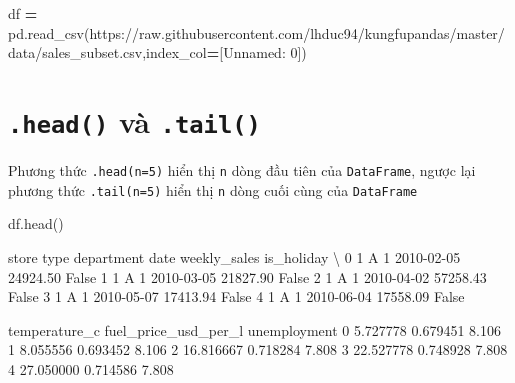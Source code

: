\documentclass[
]{book}
\newenvironment{Shaded}{\begin{snugshade}}{\end{snugshade}}
\newcommand{\NormalTok}[1]{#1}
\newcommand{\OperatorTok}[1]{\textcolor[rgb]{0.81,0.36,0.00}{\textbf{#1}}}
\newcommand{\StringTok}[1]{\textcolor[rgb]{0.31,0.60,0.02}{#1}}
\begin{document}
\begin{Shaded}
\begin{Highlighting}[]
\NormalTok{df }\OperatorTok{=}\NormalTok{ pd.read\_csv(}\StringTok{\textquotesingle{}https://raw.githubusercontent.com/lhduc94/kungfupandas/master/data/sales\_subset.csv\textquotesingle{}}\NormalTok{,index\_col}\OperatorTok{=}\NormalTok{[}\StringTok{\textquotesingle{}Unnamed: 0\textquotesingle{}}\NormalTok{])}
\end{Highlighting}
\end{Shaded}

\section{\texorpdfstring{\texttt{.head()} và \texttt{.tail()}}{.head() và .tail()}}\label{head-vuxe0-.tail}

Phương thức \texttt{.head(n=5)} hiển thị \texttt{n} dòng đầu tiên của \texttt{DataFrame}, ngược lại phương thức \texttt{.tail(n=5)} hiển thị \texttt{n} dòng cuối cùng của \texttt{DataFrame}

\begin{Shaded}
\begin{Highlighting}[]
\NormalTok{df.head()}
\end{Highlighting}
\end{Shaded}

\begin{Shaded}
\begin{Highlighting}[]
\NormalTok{        store type  department        date  weekly\_sales  is\_holiday  \textbackslash{}}
\NormalTok{0      1    A           1  2010{-}02{-}05      24924.50       False   }
\NormalTok{1      1    A           1  2010{-}03{-}05      21827.90       False   }
\NormalTok{2      1    A           1  2010{-}04{-}02      57258.43       False   }
\NormalTok{3      1    A           1  2010{-}05{-}07      17413.94       False   }
\NormalTok{4      1    A           1  2010{-}06{-}04      17558.09       False }

\NormalTok{   temperature\_c  fuel\_price\_usd\_per\_l  unemployment  }
\NormalTok{0       5.727778              0.679451         8.106  }
\NormalTok{1       8.055556              0.693452         8.106  }
\NormalTok{2      16.816667              0.718284         7.808  }
\NormalTok{3      22.527778              0.748928         7.808  }
\NormalTok{4      27.050000              0.714586         7.808  }
\end{Highlighting}
\end{Shaded}
\end{document}
